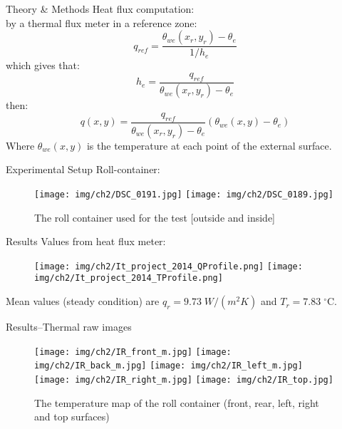 \begin{frame}{Theory \& Methods}
    Heat flux computation:\\ 
    by a thermal flux meter in a reference zone:
    \begin{equation*}
        q_{ref} = \frac{\theta_{we}(x_r,y_r)-\theta_e}{1/h_e}
    \end{equation*}
    which gives that:
    \begin{equation*}
        h_e = \frac{q_{ref}}{\theta_{we}(x_r,y_r)-\theta_e}
    \end{equation*}
    then:
    \begin{equation*}
        q(x,y) = \frac{q_{ref}}{\theta_{we}(x_r,y_r)-\theta_e}(\theta_{we}(x,y)-\theta_e)
    \end{equation*}
    Where $\theta_{we}(x,y)$ is the temperature at each point of the external surface.    
\end{frame}


\begin{frame}{Experimental Setup}
Roll-container:
    \begin{figure}[!htbp]
        \centering
        \texttt{[image: img/ch2/DSC\_0191.jpg]}
        \texttt{[image: img/ch2/DSC\_0189.jpg]}
        \caption{The roll container used for the test [outside and inside]}
    \end{figure}
\end{frame}


\begin{frame}{Results}
Values from heat flux meter:
    \begin{figure}
        \hspace*{-18pt}
        \texttt{[image: img/ch2/It\_project\_2014\_QProfile.png]}
        \texttt{[image: img/ch2/It\_project\_2014\_TProfile.png]}
    \end{figure}
    \centering
    \small{Mean values (steady condition) are $q_r=9.73\; W/(m^2 K)$ and $T_r = 7.83\; ^\circ$C.}
\end{frame}


\begin{frame}{Results--\small{Thermal raw images}}
    \begin{figure}
        \vspace*{-5pt}
        \centering
        \texttt{[image: img/ch2/IR\_front\_m.jpg]}
        \hspace{5pt}
        \texttt{[image: img/ch2/IR\_back\_m.jpg]}
        \texttt{[image: img/ch2/IR\_left\_m.jpg]}
        \hspace{5pt}
        \texttt{[image: img/ch2/IR\_right\_m.jpg]}
        \texttt{[image: img/ch2/IR\_top.jpg]}
        \vspace*{-5pt}
        \caption{\footnotesize{The temperature map of the roll container (front, rear, left, right and top surfaces)}}
    \end{figure}
\end{frame}

